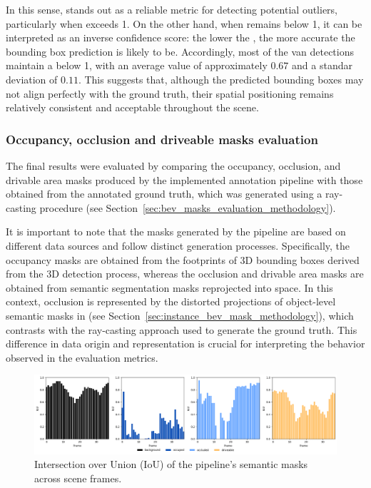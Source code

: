 In this sense,  stands out as a reliable metric for detecting potential outliers, particularly when  exceeds 1. On the other hand, when  remains below 1, it can be interpreted as an inverse confidence score: the lower the , the more accurate the bounding box prediction is likely to be. Accordingly, most of the van detections maintain a  below 1, with an average value of approximately $0.67$ and a standar deviation of $0.11$. This suggests that, although the predicted bounding boxes may not align perfectly with the ground truth, their spatial positioning remains relatively consistent and acceptable throughout the scene.

\subsubsection{Occupancy, occlusion and driveable masks evaluation}
The final results were evaluated by comparing the occupancy, occlusion, and drivable area masks produced by the implemented annotation pipeline with those obtained from the annotated ground truth, which was generated using a ray-casting procedure (see Section~\ref{sec:bev_masks_evaluation_methodology}).

It is important to note that the masks generated by the pipeline are based on different data sources and follow distinct generation processes. Specifically, the occupancy masks are obtained from the footprints of 3D bounding boxes derived from the 3D detection process, whereas the occlusion and drivable area masks are obtained from semantic segmentation masks reprojected into  space. In this context, occlusion is represented by the distorted projections of object-level semantic masks in  (see Section~\ref{sec:instance_bev_mask_methodology}), which contrasts with the ray-casting approach used to generate the ground truth. This difference in data origin and representation is crucial for interpreting the behavior observed in the evaluation metrics.

\begin{figure}[h!]
    \centering
    \includegraphics[width=\linewidth]{./images/experiments/iou_occ2_masks.png}
    \caption{Intersection over Union (IoU) of the pipeline's semantic masks across scene frames.}
    \label{fig:scene_iou_occ2_masks}
\end{figure}

